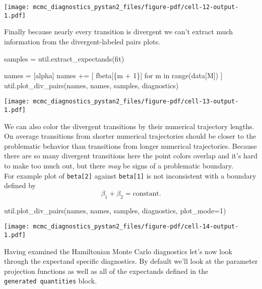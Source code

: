 \documentclass[
  letterpaper,
  DIV=11,
  numbers=noendperiod]{scrartcl}
\newenvironment{Shaded}{\begin{snugshade}}{\end{snugshade}}
\newcommand{\BuiltInTok}[1]{\textcolor[rgb]{0.00,0.23,0.31}{#1}}
\newcommand{\ControlFlowTok}[1]{\textcolor[rgb]{0.00,0.23,0.31}{#1}}
\newcommand{\DecValTok}[1]{\textcolor[rgb]{0.68,0.00,0.00}{#1}}
\newcommand{\KeywordTok}[1]{\textcolor[rgb]{0.00,0.23,0.31}{#1}}
\newcommand{\NormalTok}[1]{\textcolor[rgb]{0.00,0.23,0.31}{#1}}
\newcommand{\OperatorTok}[1]{\textcolor[rgb]{0.37,0.37,0.37}{#1}}
\newcommand{\SpecialCharTok}[1]{\textcolor[rgb]{0.37,0.37,0.37}{#1}}
\newcommand{\SpecialStringTok}[1]{\textcolor[rgb]{0.13,0.47,0.30}{#1}}
\newcommand{\StringTok}[1]{\textcolor[rgb]{0.13,0.47,0.30}{#1}}
\begin{document}
\texttt{[image: mcmc\_diagnostics\_pystan2\_files/figure-pdf/cell-12-output-1.pdf]}

Finally because nearly every transition is divergent we can't extract
much information from the divergent-labeled pairs plots.

\begin{Shaded}
\begin{Highlighting}[]
\NormalTok{samples }\OperatorTok{=}\NormalTok{ util.extract\_expectands(fit)}

\NormalTok{names }\OperatorTok{=}\NormalTok{ [}\StringTok{\textquotesingle{}alpha\textquotesingle{}}\NormalTok{]}
\NormalTok{names }\OperatorTok{+=}\NormalTok{ [ }\SpecialStringTok{f\textquotesingle{}beta[}\SpecialCharTok{\{}\NormalTok{m }\OperatorTok{+} \DecValTok{1}\SpecialCharTok{\}}\SpecialStringTok{]\textquotesingle{}} \ControlFlowTok{for}\NormalTok{ m }\KeywordTok{in} \BuiltInTok{range}\NormalTok{(data[}\StringTok{\textquotesingle{}M\textquotesingle{}}\NormalTok{]) ]}
\NormalTok{util.plot\_div\_pairs(names, names, samples, diagnostics)}
\end{Highlighting}
\end{Shaded}

\texttt{[image: mcmc\_diagnostics\_pystan2\_files/figure-pdf/cell-13-output-1.pdf]}

We can also color the divergent transitions by their numerical
trajectory lengths. On average transitions from shorter numerical
trajectories should be closer to the problematic behavior than
transitions from longer numerical trajectories. Because there are so
many divergent transitions here the point colors overlap and it's hard
to make too much out, but there \emph{may} be signs of a problematic
boundary.\\
For example plot of \texttt{beta{[}2{]}} against \texttt{beta{[}1{]}} is
not inconsistent with a boundary defined by \[
\beta_{1} + \beta_{2} = \mathrm{constant}.
\]

\begin{Shaded}
\begin{Highlighting}[]
\NormalTok{util.plot\_div\_pairs(names, names, samples, diagnostics, plot\_mode}\OperatorTok{=}\DecValTok{1}\NormalTok{)}
\end{Highlighting}
\end{Shaded}

\texttt{[image: mcmc\_diagnostics\_pystan2\_files/figure-pdf/cell-14-output-1.pdf]}

Having examined the Hamiltonian Monte Carlo diagnostics let's now look
through the expectand specific diagnostics. By default we'll look at the
parameter projection functions as well as all of the expectands defined
in the \texttt{generated\ quantities} block.
\end{document}
